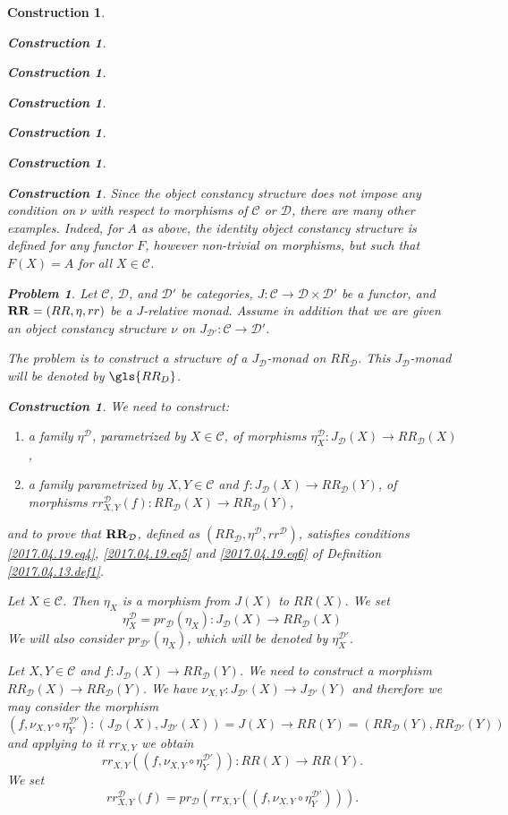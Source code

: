 \documentclass[onecolumn,12pt]{amsart}
\numberwithin{proposition}{subsection}
\newtheorem{problem}[proposition]{Problem}
\newtheorem{construction}[proposition]{Construction}
\newcommand{\sr}{\rightarrow}
\newcommand{\RR}{{\bf RR}}
\newcommand{\C}{{\mathcal C}}
\newcommand{\D}{{\mathcal D}}
\begin{document}
\begin{construction}
\begin{construction}
\begin{construction}
\begin{construction}
\begin{construction}
\begin{construction}
\begin{construction}
Since the object constancy structure does not impose any condition on $\nu$
with respect to morphisms of $\C$ or $\D$, there are many other
examples. Indeed, for $A$ as above, the identity object constancy structure is
defined for any functor $F$, however non-trivial on morphisms, but such that
$F(X)=A$ for all $X\in\C$.
%
\begin{problem}
\label{2017.04.21.prob1}
Let $\C$, $\D$, and $\D'$ be categories, $J:\C\sr \D\times\D'$ be a functor, and
$\RR=(RR,\eta,rr)$ be a $J$-relative monad. Assume in addition that we are given
an object constancy structure $\nu$ on $J_{\D'}:\C\sr\D'$.

The problem is to construct a structure of a $J_{\D}$-monad on $RR_{\D}$. This $J_{\D}$-monad will be denoted by $\gls{RR_D}$.
\end{problem}
%
\begin{construction}\rm
\label{2017.04.21.constr1}
We need to construct:
%
\begin{enumerate}
\item a family $\eta^{\D}$, parametrized by $X\in\C$, of morphisms $\eta^{\D}_X:J_{\D}(X)\sr RR_{\D}(X)$,
\item a family parametrized by $X,Y\in\C$ and $f:J_{\D}(X)\sr RR_{\D}(Y)$, of morphisms $rr^{\D}_{X,Y}(f):RR_{\D}(X)\sr RR_{\D}(Y)$,
\end{enumerate}
%
and to prove that $\RR_{\D}$, defined as $(RR_{\D},\eta^{\D},rr^{\D})$,
satisfies conditions \ref{2017.04.19.eq4}, \ref{2017.04.19.eq5} and
\ref{2017.04.19.eq6} of Definition \ref{2017.04.13.def1}.

Let $X\in\C$. Then $\eta_X$ is a morphism from $J(X)$ to $RR(X)$. We set 
%
\begin{equation}
\label{2017.04.21.eq1}
\eta^{\D}_X=pr_{\D}(\eta_X):J_{\D}(X)\sr RR_{\D}(X)
\end{equation}%
%
We will also consider $pr_{\D'}(\eta_X)$, which will be denoted by $\eta^{\D'}_X$. 

Let $X,Y\in\C$ and $f:J_{\D}(X)\sr RR_{\D}(Y)$. We need to construct a morphism
$RR_{\D}(X)\sr RR_{\D}(Y)$. We have $\nu_{X,Y}:J_{\D'}(X)\sr J_{\D'}(Y)$ and
therefore we may consider the morphism
%
$$(f,\nu_{X,Y}\circ \eta^{\D'}_Y):(J_{\D}(X),J_{\D'}(X))=J(X)\sr RR(Y)=(RR_{\D}(Y),RR_{\D'}(Y))$$
%
and applying to it $rr_{X,Y}$ we obtain 
%
$$rr_{X,Y}((f,\nu_{X,Y}\circ \eta^{\D'}_Y)):RR(X)\sr RR(Y).$$
%
We set
%
\begin{equation}
\label{2017.04.21.eq2}
rr^{\D}_{X,Y}(f)=pr_{\D}(rr_{X,Y}((f,\nu_{X,Y}\circ \eta^{\D'}_Y))).
\end{equation}%
%


\end{construction}
\end{construction}
\end{construction}
\end{construction}
\end{construction}
\end{construction}
\end{construction}
\end{construction}
\end{document}
